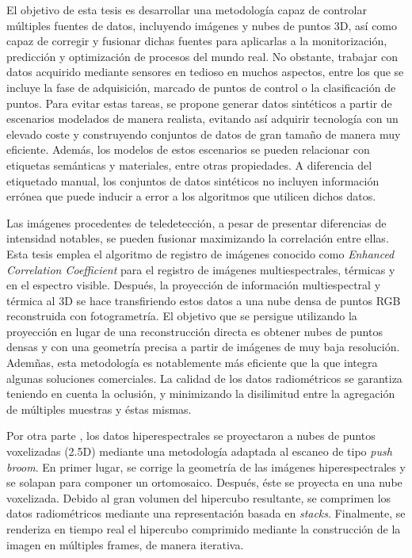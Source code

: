 \newpage
{}

\normalsize
\libertineNormal

El objetivo de esta tesis es desarrollar una metodología capaz de controlar múltiples fuentes de datos, incluyendo imágenes y nubes de puntos 3D, así como capaz de corregir y fusionar dichas fuentes para aplicarlas a la monitorización, predicción y optimización de procesos del mundo real. No obstante, trabajar con datos acquirido mediante sensores en tedioso en muchos aspectos, entre los que se incluye la fase de adquisición, marcado de puntos de control o la clasificación de puntos. Para evitar estas tareas, se propone generar datos sintéticos a partir de escenarios modelados de manera realista, evitando así adquirir tecnología con un elevado coste y construyendo conjuntos de datos de gran tamaño de manera muy eficiente. Además, los modelos de estos escenarios se pueden relacionar con etiquetas semánticas y materiales, entre otras propiedades. A diferencia del etiquetado manual, los conjuntos de datos sintéticos no incluyen información errónea que puede inducir a error a los algoritmos que utilicen dichos datos.

Las imágenes procedentes de teledetección, a pesar de presentar diferencias de intensidad notables, se pueden fusionar maximizando la correlación entre ellas. Esta tesis emplea el algoritmo de registro de imágenes conocido como \textit{Enhanced Correlation Coefficient} para el registro de imágenes multiespectrales, térmicas y en el espectro visible. Después, la proyección de información multiespectral y térmica al 3D se hace transfiriendo estos datos a una nube densa de puntos RGB reconstruida con fotogrametría. El objetivo que se persigue utilizando la proyección en lugar de una reconstrucción directa es obtener nubes de puntos densas y con una geometría precisa a partir de imágenes de muy baja resolución. Ademñas, esta metodología es notablemente más eficiente que la que integra algunas soluciones comerciales. La calidad de los datos radiométricos se garantiza teniendo en cuenta la oclusión, y minimizando la disilimitud entre la agregación de múltiples muestras y éstas mismas.

Por otra parte , los datos hiperespectrales se proyectaron a nubes de puntos voxelizadas (2.5D) mediante una metodología adaptada al escaneo de tipo \textit{push broom}. En primer lugar, se corrige la geometría de las imágenes hiperespectrales y se solapan para componer un ortomosaico. Después, éste se proyecta en una nube voxelizada. Debido al gran volumen del hipercubo resultante, se comprimen los datos radiométricos mediante una representación basada en \textit{stacks}. Finalmente, se renderiza en tiempo real el hipercubo comprimido mediante la construcción de la imagen en múltiples frames, de manera iterativa.
 
